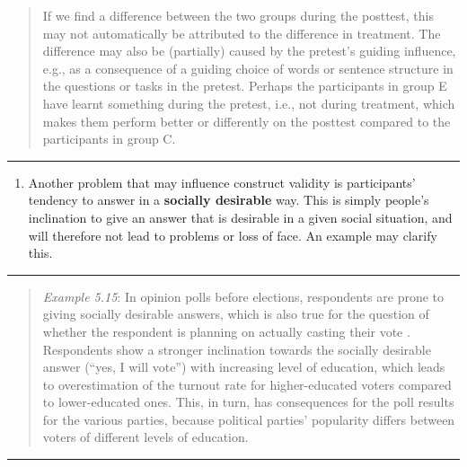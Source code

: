 \documentclass[
]{book}
\providecommand{\tightlist}{%
  \setlength{\itemsep}{0pt}\setlength{\parskip}{0pt}}
\begin{document}
\begin{quote}
If we find a difference between the two groups during the posttest, this may not automatically be attributed to the difference in treatment. The difference may also be (partially) caused by the pretest's guiding influence, e.g., as a consequence of a guiding choice of words or sentence structure in the questions or tasks in the pretest. Perhaps the participants in group E have learnt something during the pretest, i.e., not during treatment, which makes them perform better or differently on the posttest compared to the participants in group C.
\end{quote}

\begin{center}\rule{0.5\linewidth}{0.5pt}\end{center}

\begin{enumerate}
\def\labelenumi{\arabic{enumi}.}
\setcounter{enumi}{5}
\tightlist
\item
  Another problem that may influence construct validity is participants' tendency to answer in a \textbf{socially desirable} way. This is simply people's inclination to give an answer that is desirable in a given social situation, and will therefore not lead to problems or loss of face. An example may clarify this.
\end{enumerate}

\begin{center}\rule{0.5\linewidth}{0.5pt}\end{center}

\begin{quote}
\emph{Example 5.15}: In opinion polls before elections, respondents are prone to giving socially desirable answers, which is also true for the question of whether the respondent is planning on actually casting their vote \citep{Karp05}. Respondents show a stronger inclination towards the socially desirable answer (``yes, I will vote'') with increasing level of education, which leads to overestimation of the turnout rate for higher-educated voters compared to lower-educated ones. This, in turn, has consequences for the poll results for the various parties, because political parties' popularity differs between voters of different levels of education.
\end{quote}

\begin{center}\rule{0.5\linewidth}{0.5pt}\end{center}
\end{document}
